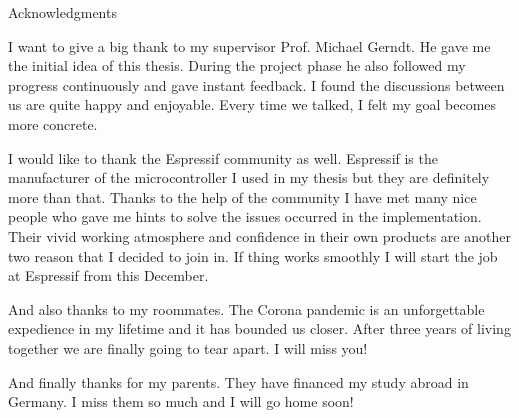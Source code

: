 \thispagestyle{empty}

\vspace*{2cm}

\begin{center}
{ Acknowledgments}
\end{center}

\vspace{1cm}

I want to give a big thank to my supervisor Prof. Michael Gerndt. He gave me the initial idea of this thesis. During the project phase he also followed my progress continuously and gave instant feedback. I found the discussions between us are quite happy and enjoyable. Every time we talked, I felt my goal becomes more concrete.

I would like to thank the Espressif community as well. Espressif is the manufacturer of the microcontroller I used in my thesis but they are definitely more than that. Thanks to the help of the community I have met many nice people who gave me hints to solve the issues occurred in the implementation. Their vivid working atmosphere and confidence in their own products are another two reason that I decided to join in. If thing works smoothly I will start the job at Espressif from this December.

And also thanks to my roommates. The Corona pandemic is an unforgettable expedience in my lifetime and it has bounded us closer. After three years of living together we are finally going to tear apart. I will miss you!

And finally thanks for my parents. They have financed my study abroad in Germany. I miss them so much and I will go home soon! 

\cleardoublepage{}

